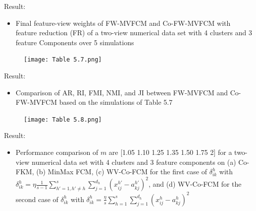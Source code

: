 \documentclass[compress,sky blue]{beamer}
\begin{document}
\begin{frame}{Result:  }

\begin{itemize}
\item \scriptsize{Final feature-view weights of FW-MVFCM and Co-FW-MVFCM with feature reduction (FR) of a two-view numerical data set with 4 clusters and 3 feature Components over 5 simulations}
\end{itemize}

\begin{figure}
\texttt{[image: Table 5.7.png]}
\end{figure}
\end{frame}

\begin{frame}{Result:  }

\begin{itemize}
\item \scriptsize{Comparison of AR, RI, FMI, NMI, and JI between FW-MVFCM and Co-FW-MVFCM based on the simulations of Table 5.7}
\end{itemize}

\begin{figure}
\texttt{[image: Table 5.8.png]}
\end{figure}
\end{frame}

\begin{frame}{Result:  }

\begin{itemize}
\item \footnotesize{Performance comparison of $m$ are [1.05 1.10 1.25 1.35 1.50 1.75 2] for a two-view numerical data set with 4 clusters and 3 feature components on (a) Co-FKM, (b) MinMax FCM, (c) WV-Co-FCM for the first case of $\delta_{ik}^{h}$  with $\delta_{ik}^{h} = \eta \frac{1}{s-1}\sum_{h'=1, h'\neq h}^{s}\sum_{j=1}^{d_{h}}\left(x_{ij}^{h'}-a_{kj}^{h'}\right)^2$, 
and (d) WV-Co-FCM for the second case of  $\delta_{ik}^{h}$ with $\delta_{ik}^{h} = \frac{\eta}{s}\sum_{h=1}^{s}\sum_{j=1}^{d_{h}}\left(x_{ij}^{h}-a_{kj}^{h}\right)^2$}
\end{itemize}

\end{frame}
\end{document}
